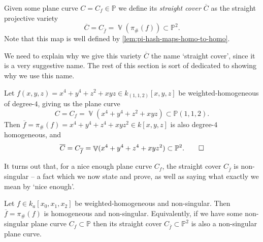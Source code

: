 \documentclass[10pt,notitlepage]{article}
\numberwithin{equation}{subsection}
\DeclareMathOperator{\van}{\mathbb{V}}
\newcommand{\pee}{\mathbb{P}}
\newcommand{\cover}[1]{\overline{#1}}
\newcommand{\kathree}{k_a[x_0,x_1,x_2]}
\begin{document}
        \begin{definition}
            Given some plane curve $C=C_f\in\pee$ we define its \emph{straight cover $\cover{C}$} as the straight projective variety
            \[
                \cover{C} = C_{\cover{f}} = \van(\pi_\#(f))\subset\pee^2.
            \]
            Note that this map is well defined by \cref{lem:pi-hash-maps-homo-to-homo}.
        \end{definition}

        We need to explain why we give this variety $\cover{C}$ the name `straight cover', since it is a very suggestive name.
        The rest of this section is sort of dedicated to showing why we use this name.

        \begin{example}
            Let $f(x,y,z)=x^4+y^4+z^2+xyz\in k_{(1,1,2)}[x,y,z]$ be weighted-homogeneous of degree-$4$, giving us the plane curve
            \[
                C = C_f = \van(x^4+y^4+z^2+xyz) \subset \pee(1,1,2).
            \]
            Then $\cover{f} = \pi_\#(f) = x^4+y^4+z^4+xyz^2\in k[x,y,z]$ is also degree-$4$ homogeneous, and
            \[
                \cover{C} = C_{\cover{f}} = \van(x^4+y^4+z^4+xyz^2) \subset \pee^2.\qedhere
            \]
        \end{example}

        It turns out that, for a nice enough plane curve $C_f$, the straight cover $C_{\cover{f}}$ is non-singular -- a fact which we now state and prove, as well as saying what exactly we mean by `nice enough'.

        \begin{lemma}\label{lem:cover-is-smooth-pc-and-things}
            Let $f\in\kathree$ be weighted-homogeneous and non-singular.
            Then $\cover{f}=\pi_\#(f)$ is homogeneous and non-singular.
            Equivalently, if we have some non-singular plane curve $C_f\subset\pee$ then its straight cover $C_{\cover{f}}\subset\pee^2$ is also a non-singular plane curve.
        \end{lemma}
\end{document}
